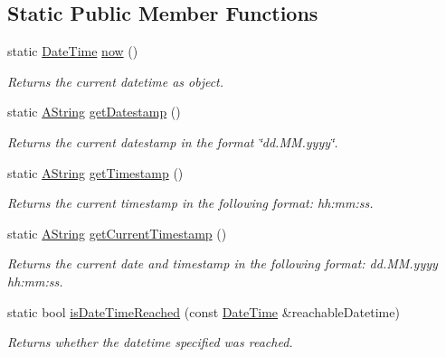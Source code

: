 \subsection*{Static Public Member Functions}
\begin{DoxyCompactItemize}
\item 
\mbox{\label{class_date_time_af28627b5a5a2cdc02f5fc388b07c91e7}} 
static \mbox{\hyperlink{class_date_time}{Date\+Time}} \mbox{\hyperlink{class_date_time_af28627b5a5a2cdc02f5fc388b07c91e7}{now}} ()
\begin{DoxyCompactList}\small\item\em Returns the current datetime as object. \end{DoxyCompactList}\item 
static \mbox{\hyperlink{class_a_string}{A\+String}} \mbox{\hyperlink{class_date_time_ab8bbdb70e38a18cad9269b6f856f5634}{get\+Datestamp}} ()
\begin{DoxyCompactList}\small\item\em Returns the current datestamp in the format \char`\"{}dd.\+M\+M.\+yyyy\char`\"{}. \end{DoxyCompactList}\item 
static \mbox{\hyperlink{class_a_string}{A\+String}} \mbox{\hyperlink{class_date_time_a272b1eca3f3aafc7d275ec5e8831a6ca}{get\+Timestamp}} ()
\begin{DoxyCompactList}\small\item\em Returns the current timestamp in the following format\+: hh\+:mm\+:ss. \end{DoxyCompactList}\item 
static \mbox{\hyperlink{class_a_string}{A\+String}} \mbox{\hyperlink{class_date_time_aee3108295b202fc4807984c25778c942}{get\+Current\+Timestamp}} ()
\begin{DoxyCompactList}\small\item\em Returns the current date and timestamp in the following format\+: dd.\+M\+M.\+yyyy hh\+:mm\+:ss. \end{DoxyCompactList}\item 
static bool \mbox{\hyperlink{class_date_time_a14a0e5a9af8caf8ab46bebd6e101daf0}{is\+Date\+Time\+Reached}} (const \mbox{\hyperlink{class_date_time}{Date\+Time}} \&reachable\+Datetime)
\begin{DoxyCompactList}\small\item\em Returns whether the datetime specified was reached. \end{DoxyCompactList}\item 

\end{DoxyCompactItemize}
